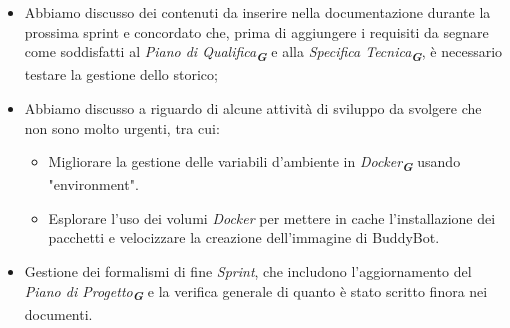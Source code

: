 \begin{itemize}
\begin{itemize}
    \end{itemize}
    \item Abbiamo discusso dei contenuti da inserire nella documentazione durante la prossima sprint e concordato che, prima di aggiungere i requisiti da segnare come soddisfatti al \emph{Piano di Qualifica}\textsubscript{\textit{\textbf{G}}} e alla \emph{Specifica Tecnica}\textsubscript{\textit{\textbf{G}}}, è necessario testare la gestione dello storico;
    \item Abbiamo discusso a riguardo di alcune attività di sviluppo da svolgere che non sono molto urgenti, tra cui: 
    \begin{itemize}
        \item Migliorare la gestione delle variabili d'ambiente in \emph{Docker}\textsubscript{\textit{\textbf{G}}} usando "environment".
        \item Esplorare l'uso dei volumi \emph{Docker} per mettere in cache l'installazione dei pacchetti e velocizzare la creazione dell'immagine di BuddyBot.
    \end{itemize}
    \item Gestione dei formalismi di fine \emph{Sprint}, che includono l'aggiornamento del \emph{Piano di Progetto}\textsubscript{\textit{\textbf{G}}} e la verifica generale di quanto è stato scritto finora nei documenti.
\end{itemize}



